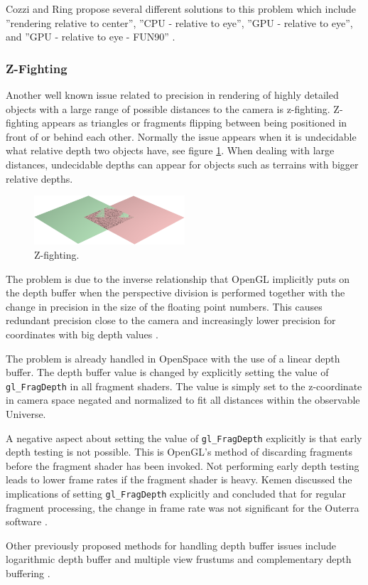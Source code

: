 Cozzi and Ring propose several different solutions to this problem which include ''rendering relative to center'', ''CPU - relative to eye'', ''GPU - relative to eye'', and ''GPU - relative to eye - FUN90'' \cite{cozzi11}. 

\subsubsection{Z-Fighting}

Another well known issue related to precision in rendering of highly detailed objects with a large range of possible distances to the camera is z-fighting. Z-fighting appears as triangles or fragments flipping between being positioned in front of or behind each other. Normally the issue appears when it is undecidable what relative depth two objects have, see figure \ref{fig:zfighting}. When dealing with large distances, undecidable depths can appear for objects such as terrains with bigger relative depths.

\begin{figure}[htbp]
    \centering
    \includegraphics[width=0.5\textwidth]{figures/zfighting.png}
    \caption{Z-fighting.}
    \label{fig:zfighting}
\end{figure}

The problem is due to the inverse relationship that OpenGL implicitly puts on the depth buffer when the perspective division is performed together with the change in precision in the size of the floating point numbers. This causes redundant precision close to the camera and increasingly lower precision for coordinates with big depth values \cite{cozzi11}.

The problem is already handled in OpenSpace with the use of a linear depth buffer. The depth buffer value is changed by explicitly setting the value of \texttt{gl\_FragDepth} in all fragment shaders. The value is simply set to the z-coordinate in camera space negated and normalized to fit all distances within the observable Universe.

A negative aspect about setting the value of \texttt{gl\_FragDepth} explicitly is that early depth testing is not possible. This is OpenGL's method of discarding fragments before the fragment shader has been invoked. Not performing early depth testing leads to lower frame rates if the fragment shader is heavy. Kemen discussed the implications of setting \texttt{gl\_FragDepth} explicitly and concluded that for regular fragment processing, the change in frame rate was not significant for the Outerra software \cite{kemen12}.

Other previously proposed methods for handling depth buffer issues include logarithmic depth buffer and multiple view frustums and complementary depth buffering \cite{cozzi11}.

